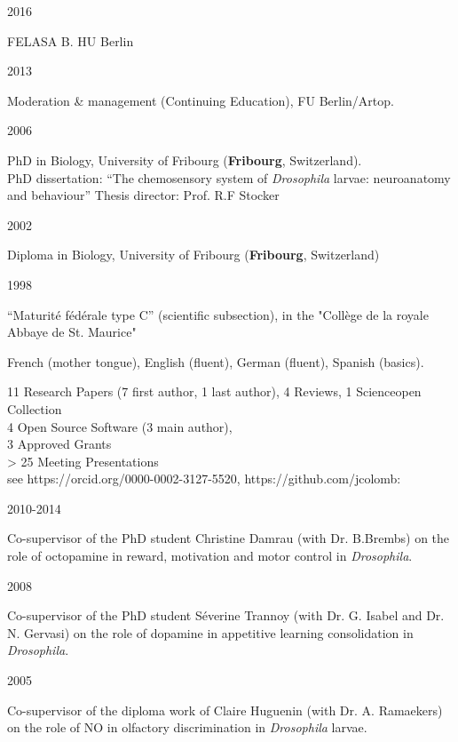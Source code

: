         
\parbox{0.15\textwidth}{2016}\hfill
\parbox[t]{0.83\textwidth}{FELASA B. HU Berlin
        }
\parbox{0.15\textwidth}{2013}\hfill
\parbox[t]{0.83\textwidth}{Moderation \& management (Continuing Education), FU Berlin/Artop.
        }
\parbox{0.15\textwidth}{2006}\hfill
\parbox[t]{0.83\textwidth}{PhD in Biology,
        University of Fribourg (\textbf{Fribourg}, Switzerland).\\
        PhD dissertation: ``The chemosensory system of \textit{Drosophila} larvae: neuroanatomy and behaviour''
        Thesis director: Prof. R.F Stocker}
\parbox{0.15\textwidth}{2002}\hfill
\parbox[t]{0.83\textwidth}{Diploma in Biology,
        University of Fribourg (\textbf{Fribourg}, Switzerland)
        }
\parbox{0.15\textwidth}{1998}\hfill
\parbox[t]{0.83\textwidth}{``Maturit\'e f\'ed\'erale type C'' (scientific subsection),
in the "Coll\`ege de la royale Abbaye de St. Maurice"}

 French (mother tongue), English (fluent),
German (fluent), Spanish (basics).

%
11 Research Papers (7 first author, 1 last author), 4 Reviews, 1 Scienceopen Collection\\
 4 Open Source Software (3 main author), \\
 3 Approved Grants \\
 > 25 Meeting Presentations \\
 see https://orcid.org/0000-0002-3127-5520, https://github.com/jcolomb: %






\parbox{0.15\textwidth}{2010-2014}\hfill
	\parbox[t]{0.83\textwidth}{Co-supervisor of the PhD student Christine Damrau
(with Dr. B.Brembs) on the role of octopamine in reward, motivation and motor control in  \textit{Drosophila}.}
\parbox{0.15\textwidth}{2008}\hfill
	\parbox[t]{0.83\textwidth}{Co-supervisor of the PhD student S\'everine Trannoy
(with Dr. G. Isabel and Dr. N. Gervasi) on the role of dopamine in appetitive learning consolidation in  \textit{Drosophila}.}
\parbox{0.15\textwidth}{2005}\hfill
\parbox[t]{0.83\textwidth}{Co-supervisor of the diploma work of Claire Huguenin
(with Dr. A. Ramaekers) on the role of NO in olfactory discrimination in \textit{Drosophila} larvae.}





